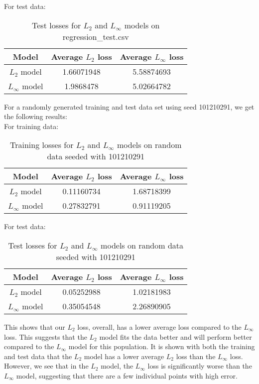 \documentclass[12pt]{article}
\newcounter{ques}
\newenvironment{question}{\stepcounter{ques}{\noindent\bf Question \arabic{ques}:}}{\vspace{5mm}}
\begin{document}
\begin{question}
\begin{enumerate}[(a)]
\begin{enumerate}[(c.1)]
\begin{table}[H]
        \label{tab:training_losses_csv}
      \end{table}
      For test data: 
      \begin{table}[H]
        \centering
        \begin{tabular}{|c|c|c|}
          \hline
          Model & Average $L_2$ loss & Average $L_\infty$ loss \\ 
          \hline
          $L_2$ model & 1.66071948 & 5.58874693 \\ 
          $L_\infty$ model & 1.9868478 & 5.02664782 \\ 
          \hline
        \end{tabular}
        \caption{Test losses for $L_2$ and $L_\infty$ models on regression\_test.csv}
        \label{tab:test_losses_csv}
      \end{table}
      For a randomly generated training and test data set using seed 101210291, we get the following results: \\[0.5 em]
      For training data:
      \begin{table}[H]
        \centering
        \begin{tabular}{|c|c|c|}
          \hline
          Model & Average $L_2$ loss & Average $L_\infty$ loss \\ 
          \hline
          $L_2$ model & 0.11160734 & 1.68718399 \\ 
          $L_\infty$ model & 0.27832791 & 0.91119205 \\ 
          \hline
        \end{tabular}
        \caption{Training losses for $L_2$ and $L_\infty$ models on random data seeded with 101210291}
        \label{tab:train_losses_rand}
      \end{table}
      For test data:
      \begin{table}[H]
        \centering
        \begin{tabular}{|c|c|c|}
          \hline
          Model & Average $L_2$ loss & Average $L_\infty$ loss \\ 
          \hline
          $L_2$ model & 0.05252988 & 1.02181983 \\ 
          $L_\infty$ model & 0.35054548 & 2.26890905 \\ 
          \hline
        \end{tabular}
        \caption{Test losses for $L_2$ and $L_\infty$ models on random data seeded with 101210291}
        \label{tab:test_losses_rand}
      \end{table}
      This shows that our $L_2$ loss, overall, has a lower average loss compared to the $L_\infty$ loss. This suggests that the $L_2$ model fits the data better and will perform better compared to the $L_\infty$ model for this population. It is shown with both the training and test data that the $L_2$ model has a lower average $L_2$ loss than the $L_\infty$ loss. However, we see that in the $L_2$ model, the $L_\infty$ loss is significantly worse than the $L_\infty$ model, suggesting that there are a few individual points with high error.

\end{enumerate}
\end{enumerate}
\end{question}
\end{document}
